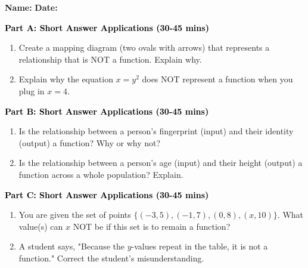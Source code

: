 \documentclass[12pt, letterpaper, fleqn]{article}
\begin{document}
\textbf{Name:} \underline{\hspace{5cm}}
\hfill
\textbf{Date:} \underline{\hspace{3cm}}\\


\begin{tcolorbox}[colback=customteal!20]
\large\textcolor{black}{\textbf{Part A: Short Answer Applications (30-45 mins)}}
\end{tcolorbox}

\vspace{3mm}

\begin{enumerate}[itemsep=4.2cm, leftmargin=0.6cm]
\item Create a mapping diagram (two ovals with arrows) that represents a relationship that is NOT a function. Explain why.
\item Explain why the equation $x = y^2$ does NOT represent a function when you plug in $x = 4$.
\end{enumerate}

\newpage

\begin{tcolorbox}[colback=customteal!20]
\large\textcolor{black}{\textbf{Part B: Short Answer Applications (30-45 mins)}}
\end{tcolorbox}

\vspace{3mm}

\begin{enumerate}[itemsep=4.2cm, leftmargin=0.6cm, resume]
\item Is the relationship between a person's fingerprint (input) and their identity (output) a function? Why or why not?
\item Is the relationship between a person's age (input) and their height (output) a function across a whole population? Explain.
\end{enumerate}

\newpage

\begin{tcolorbox}[colback=customteal!20]
\large\textcolor{black}{\textbf{Part C: Short Answer Applications (30-45 mins)}}
\end{tcolorbox}

\vspace{3mm}

\begin{enumerate}[itemsep=4.2cm, leftmargin=0.6cm, resume]
\item You are given the set of points $\{(-3, 5), (-1, 7), (0, 8), (x, 10)\}$. What value(s) can $x$ NOT be if this set is to remain a function?
\item A student says, "Because the $y$-values repeat in the table, it is not a function." Correct the student's misunderstanding.
\end{enumerate}
\end{document}
